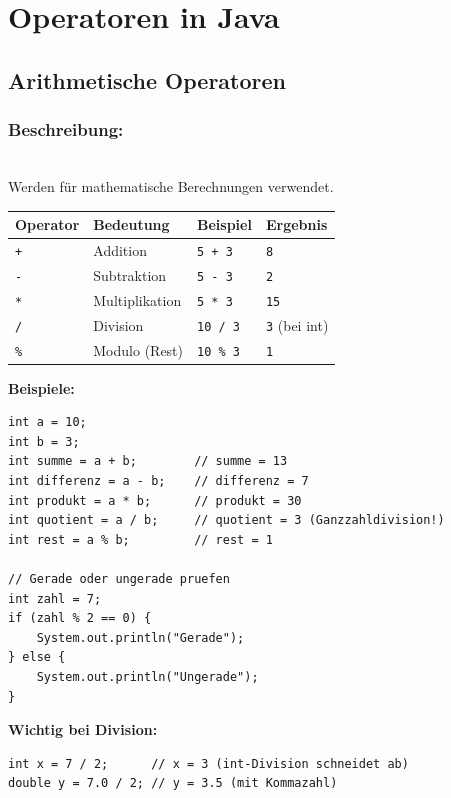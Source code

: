 \begingroup
\let\cleardoublepage\relax


\chapter*{Operatoren in Java}
\label{ch:operatoren-in-java}
\endgroup


\section*{Arithmetische Operatoren}

\subsection*{Beschreibung:}\\
Werden für mathematische Berechnungen verwendet.

\begin{center}
\begin{tabular}{|l|l|l|l|}
\hline
\textbf{Operator} & \textbf{Bedeutung} & \textbf{Beispiel} & \textbf{Ergebnis} \\
\hline
\texttt{+} & Addition & \texttt{5 + 3} & \texttt{8} \\
\hline
\texttt{-} & Subtraktion & \texttt{5 - 3} & \texttt{2} \\
\hline
\texttt{*} & Multiplikation & \texttt{5 * 3} & \texttt{15} \\
\hline
\texttt{/} & Division & \texttt{10 / 3} & \texttt{3} (bei int) \\
\hline
\texttt{\%} & Modulo (Rest) & \texttt{10 \% 3} & \texttt{1} \\
\hline
\end{tabular}
\end{center}

\textbf{Beispiele:}
\begin{lstlisting}
int a = 10;
int b = 3;
int summe = a + b;        // summe = 13
int differenz = a - b;    // differenz = 7
int produkt = a * b;      // produkt = 30
int quotient = a / b;     // quotient = 3 (Ganzzahldivision!)
int rest = a % b;         // rest = 1

// Gerade oder ungerade pruefen
int zahl = 7;
if (zahl % 2 == 0) {
    System.out.println("Gerade");
} else {
    System.out.println("Ungerade");
}
\end{lstlisting}

\textbf{Wichtig bei Division:}
\begin{lstlisting}
int x = 7 / 2;      // x = 3 (int-Division schneidet ab)
double y = 7.0 / 2; // y = 3.5 (mit Kommazahl)
\end{lstlisting}

